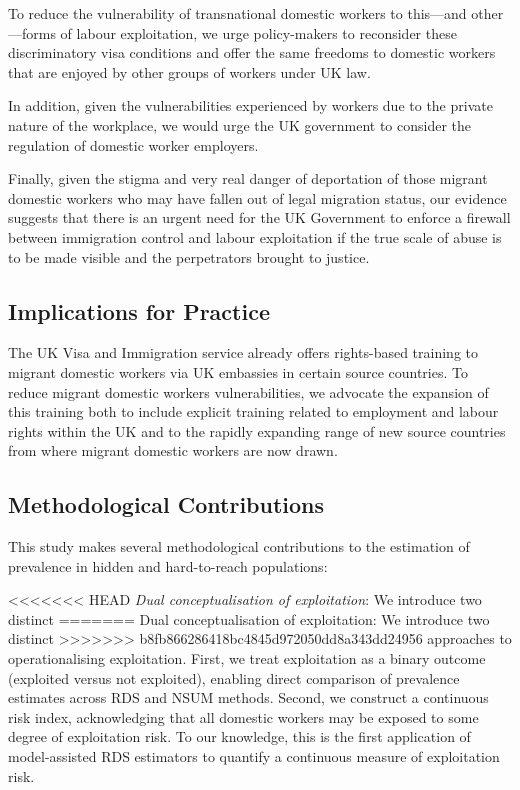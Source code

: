 \documentclass[
  12pt,
  letterpaper,
  DIV=11,
  numbers=noendperiod]{scrartcl}
\theoremstyle{plain}
\theoremstyle{definition}
\begin{document}
{To reduce the vulnerability of transnational domestic workers to
this---and other---forms of labour exploitation, we urge policy-makers
to reconsider these discriminatory visa conditions and offer the same
freedoms to domestic workers that are enjoyed by other groups of workers
under UK law.

In addition, given the vulnerabilities experienced by workers due to the
private nature of the workplace, we would urge the UK government to
consider the regulation of domestic worker employers.

Finally, given the stigma and very real danger of deportation of those
migrant domestic workers who may have fallen out of legal migration
status, our evidence suggests that there is an urgent need for the UK
Government to enforce a firewall between immigration control and labour
exploitation if the true scale of abuse is to be made visible and the
perpetrators brought to justice.

\subsection{Implications for Practice}\label{implications-for-practice}

The UK Visa and Immigration service already offers rights-based training
to migrant domestic workers via UK embassies in certain source
countries. To reduce migrant domestic workers vulnerabilities, we
advocate the expansion of this training both to include explicit
training related to employment and labour rights within the UK and to
the rapidly expanding range of new source countries from where migrant
domestic workers are now drawn.

\subsection{Methodological
Contributions}\label{methodological-contributions}

This study makes several methodological contributions to the estimation
of prevalence in hidden and hard-to-reach populations:

<<<<<<< HEAD
\emph{Dual conceptualisation of exploitation}: We introduce two distinct
=======
Dual conceptualisation of exploitation: We introduce two distinct
>>>>>>> b8fb866286418bc4845d972050dd8a343dd24956
approaches to operationalising exploitation. First, we treat
exploitation as a binary outcome (exploited versus not exploited),
enabling direct comparison of prevalence estimates across RDS and NSUM
methods. Second, we construct a continuous risk index, acknowledging
that all domestic workers may be exposed to some degree of exploitation
risk. To our knowledge, this is the first application of model-assisted
RDS estimators to quantify a continuous measure of exploitation risk.

}
\end{document}

